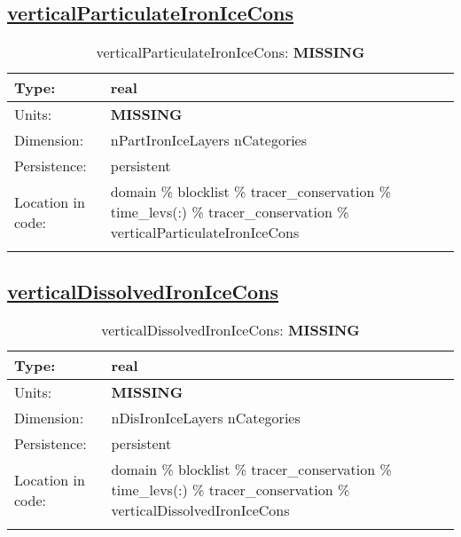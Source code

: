 \subsection[verticalParticulateIronIceCons]{\hyperref[sec:var_tab_tracer_conservation]{verticalParticulateIronIceCons}}
\label{subsec:var_sec_tracer_conservation_verticalParticulateIronIceCons}
\begin{center}
\begin{longtable}{| p{2.0in} | p{4.0in} |}
        \hline 
        Type: & real \\
        \hline 
        Units: & {\bf \color{red} MISSING} \\
        \hline 
        Dimension: & nPartIronIceLayers nCategories \\
        \hline 
        Persistence: & persistent \\
        \hline 
         Location in code: & domain \% blocklist \% tracer\_conservation \% time\_levs(:) \% tracer\_conservation \% verticalParticulateIronIceCons \\
         \hline 
    \caption{verticalParticulateIronIceCons: {\bf \color{red} MISSING}}
\end{longtable}
\end{center}
\subsection[verticalDissolvedIronIceCons]{\hyperref[sec:var_tab_tracer_conservation]{verticalDissolvedIronIceCons}}
\label{subsec:var_sec_tracer_conservation_verticalDissolvedIronIceCons}
\begin{center}
\begin{longtable}{| p{2.0in} | p{4.0in} |}
        \hline 
        Type: & real \\
        \hline 
        Units: & {\bf \color{red} MISSING} \\
        \hline 
        Dimension: & nDisIronIceLayers nCategories \\
        \hline 
        Persistence: & persistent \\
        \hline 
         Location in code: & domain \% blocklist \% tracer\_conservation \% time\_levs(:) \% tracer\_conservation \% verticalDissolvedIronIceCons \\
         \hline 
    \caption{verticalDissolvedIronIceCons: {\bf \color{red} MISSING}}
\end{longtable}
\end{center}
